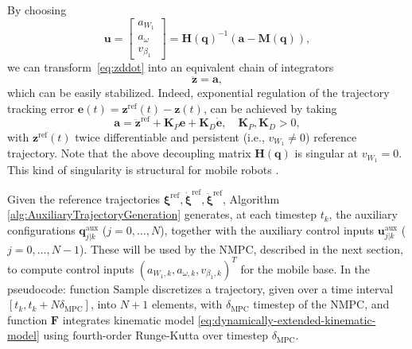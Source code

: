 By choosing
\begin{equation*}
    \bm{u} = \begin{bmatrix}
        a_{W_1} \\ a_{\omega} \\ v_{\beta_1}
    \end{bmatrix}
    = \bm{H}(\bm{q})^{-1} \left(\bm{a} - \bm{M}(\bm{q})\right),
\end{equation*}
we can transform~\eqref{eq:zddot} into an equivalent chain of integrators
\begin{equation*}
    \ddot{\bm{z}} = \bm{a},
\end{equation*}
which can be easily stabilized. Indeed, exponential regulation of the trajectory
tracking error $\bm{e}(t) = \bm{z}^{\mathrm{ref}}(t)-\bm{z}(t)$, can be
achieved by taking
\begin{equation*}
    \bm{a} = \ddot{\bm{z}}^{\mathrm{ref}} + \bm{K}_P \bm{e} + \bm{K}_D \dot{\bm{e}}, \quad \bm{K}_P, \bm{K}_D > 0,
\end{equation*}
with $\bm{z}^{\mathrm{ref}}(t)$ twice differentiable and persistent
(i.e., $v_{W_1} \ne 0$) reference trajectory. Note that the above decoupling
matrix $\bm{H}(\bm{q})$ is singular at $v_{W_1} = 0$. This kind of singularity
is structural for mobile robots \cite{Oriolo2002WMRControlDFL}.

Given the reference trajectories
$\bm{\xi}^{\mathrm{ref}}, \dot{\bm{\xi}}^{\mathrm{ref}}, \ddot{\bm{\xi}}^{\mathrm{ref}}$,
Algorithm \ref{alg:AuxiliaryTrajectoryGeneration} generates, at each timestep
$t_k$, the auxiliary configurations $\bm{q}_{j|k}^{\mathrm{aux}}$ ($j = 0, \dots, N$),
together with the auxiliary control inputs
$\bm{u}_{j|k}^{\mathrm{aux}}$ ($j = 0, \dots, N-1$). These will be used by the
NMPC, described in the next section, to compute control inputs
$(a_{W_1, k}, a_{\omega, k}, v_{\beta_1, k})^T$ for the mobile base.
In the pseudocode: function $\mathrm{Sample}$ discretizes a trajectory,
given over a time interval $[t_k, t_{k} + N \delta_{\mathrm{MPC}}]$, into
$N + 1$ elements, with $\delta_{\mathrm{MPC}}$ timestep of the NMPC, and
function $\bm{F}$ integrates kinematic model
\eqref{eq:dynamically-extended-kinematic-model} using fourth-order Runge-Kutta
over timestep $\delta_{\mathrm{MPC}}$.%

